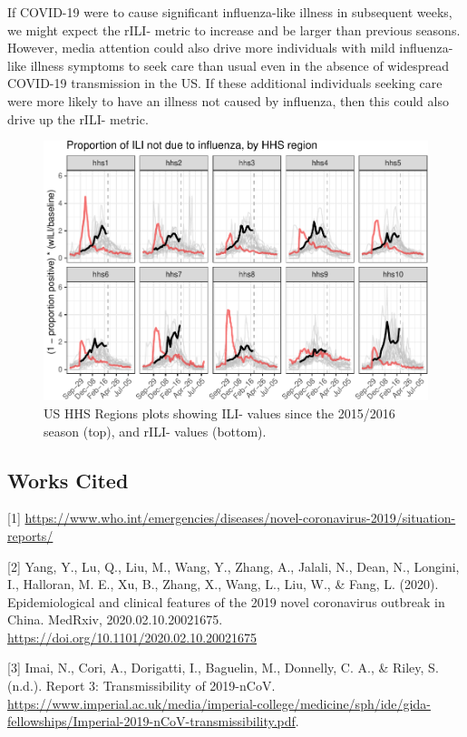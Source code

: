 \documentclass[]{article}
\begin{document}
If COVID-19 were to cause significant influenza-like illness in
subsequent weeks, we might expect the rILI- metric to increase and be
larger than previous seasons. However, media attention could also drive
more individuals with mild influenza-like illness symptoms to seek care
than usual even in the absence of widespread COVID-19 transmission in
the US. If these additional individuals seeking care were more likely to
have an illness not caused by influenza, then this could also drive up
the rILI- metric.

\begin{figure}
\centering
\includegraphics{ili-labtest-report_files/figure-latex/all-region-plot-ILI-1.pdf}
\caption{\label{fig:all-region-plot}US HHS Regions plots showing ILI-
values since the 2015/2016 season (top), and rILI- values (bottom).}
\end{figure}

\hypertarget{works-cited}{%
\subsection{Works Cited}\label{works-cited}}

{[}1{]}
\url{https://www.who.int/emergencies/diseases/novel-coronavirus-2019/situation-reports/}

{[}2{]} Yang, Y., Lu, Q., Liu, M., Wang, Y., Zhang, A., Jalali, N.,
Dean, N., Longini, I., Halloran, M. E., Xu, B., Zhang, X., Wang, L.,
Liu, W., \& Fang, L. (2020). Epidemiological and clinical features of
the 2019 novel coronavirus outbreak in China. MedRxiv,
2020.02.10.20021675. \url{https://doi.org/10.1101/2020.02.10.20021675}

{[}3{]} Imai, N., Cori, A., Dorigatti, I., Baguelin, M., Donnelly, C.
A., \& Riley, S. (n.d.). Report 3: Transmissibility of 2019-nCoV.
\url{https://www.imperial.ac.uk/media/imperial-college/medicine/sph/ide/gida-fellowships/Imperial-2019-nCoV-transmissibility.pdf}.
\end{document}
